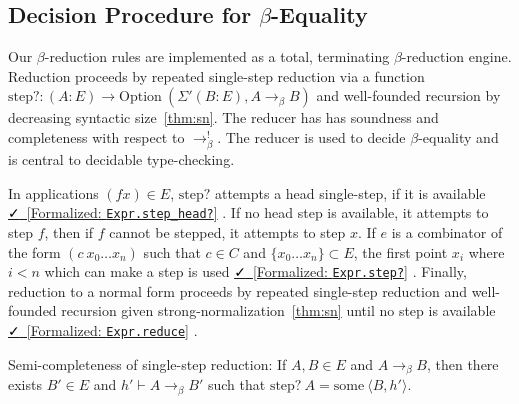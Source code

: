 \documentclass{lmcs}
\newcommand{\step}{\text{step?}}
\newcommand{\some}{\text{some}}
\newcommand{\option}{\text{Option}}
\newcommand{\leanlink}[2]{
  \href{#1}{\textcolor{black}\faCheck~[Formalized: \texttt{#2}]}%
}
\newcommand{\arr}{\rightarrow}
\newcommand{\barr}{\arr_{\beta}}
\begin{document}
\subsection{Decision Procedure for \texorpdfstring{\(\beta\)}{beta}-Equality}

Our \(\beta\)-reduction rules are implemented as a total, terminating \(\beta\)-reduction engine. Reduction proceeds by repeated single-step reduction via a function \(\step : (A : E) \rightarrow \option\ (\Sigma' (B : E), A \barr B)\) and well-founded recursion by decreasing syntactic size~\ref{thm:sn}. The reducer has has soundness and completeness with respect to \(\barr^{!}\). The reducer is used to decide \(\beta\)-equality and is central to decidable type-checking.

In applications \((f x) \in E\), \(\step\) attempts a head single-step, if it is available \leanlink{https://github.com/lexzaiello/DCC/blob/master/Dcc/Red/Run.lean\#L10}{Expr.step\_head?}. If no head step is available, it attempts to step \(f\), then if \(f\) cannot be stepped, it attempts to step \(x\). If \(e\) is a combinator of the form \((c\ x_0 \ldots x_n)\) such that \(c \in C\) and \(\{x_0 \ldots x_n\} \subset E\), the first point \(x_i\) where \(i < n\) which can make a step is used \leanlink{https://github.com/lexzaiello/DCC/blob/master/Dcc/Red/Run.lean\#L59}{Expr.step?}. Finally, reduction to a normal form proceeds by repeated single-step reduction and well-founded recursion given strong-normalization~\ref{thm:sn} until no step is available \leanlink{https://github.com/lexzaiello/DCC/blob/fb7acf6d9644df7d13c809d12609b59eaca5c763/Dcc/Red/RelationProp.lean\#L113}{Expr.reduce}.

\begin{thm}\label{thm:semicomplete}
  Semi-completeness of single-step reduction: If \(A, B \in E\) and \(A \barr B\), then there exists \(B' \in E\) and \(h' \vdash A \barr B'\) such that \(\step\ A = \some\ \langle B, h' \rangle\).
\end{thm}
\end{document}
